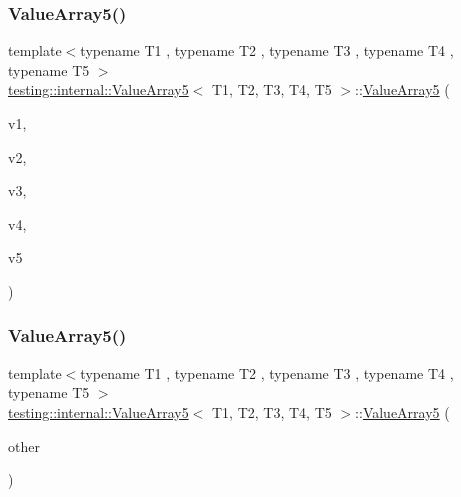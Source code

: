 \subsubsection{\texorpdfstring{ValueArray5()}{ValueArray5()}\hspace{0.1cm}{\footnotesize\ttfamily [1/2]}}
{\footnotesize\ttfamily template$<$typename T1 , typename T2 , typename T3 , typename T4 , typename T5 $>$ \\
\mbox{\hyperlink{classtesting_1_1internal_1_1ValueArray5}{testing\+::internal\+::\+Value\+Array5}}$<$ T1, T2, T3, T4, T5 $>$\+::\mbox{\hyperlink{classtesting_1_1internal_1_1ValueArray5}{Value\+Array5}} (\begin{DoxyParamCaption}\item[{T1}]{v1,  }\item[{T2}]{v2,  }\item[{T3}]{v3,  }\item[{T4}]{v4,  }\item[{T5}]{v5 }\end{DoxyParamCaption})\hspace{0.3cm}{\ttfamily [inline]}}

\mbox{\label{classtesting_1_1internal_1_1ValueArray5_a7de67e844073d0ec3c7c6e5736fb9ba6}} 
\subsubsection{\texorpdfstring{ValueArray5()}{ValueArray5()}\hspace{0.1cm}{\footnotesize\ttfamily [2/2]}}
{\footnotesize\ttfamily template$<$typename T1 , typename T2 , typename T3 , typename T4 , typename T5 $>$ \\
\mbox{\hyperlink{classtesting_1_1internal_1_1ValueArray5}{testing\+::internal\+::\+Value\+Array5}}$<$ T1, T2, T3, T4, T5 $>$\+::\mbox{\hyperlink{classtesting_1_1internal_1_1ValueArray5}{Value\+Array5}} (\begin{DoxyParamCaption}\item[{const \mbox{\hyperlink{classtesting_1_1internal_1_1ValueArray5}{Value\+Array5}}$<$ T1, T2, T3, T4, T5 $>$ \&}]{other }\end{DoxyParamCaption})\hspace{0.3cm}{\ttfamily [inline]}}



